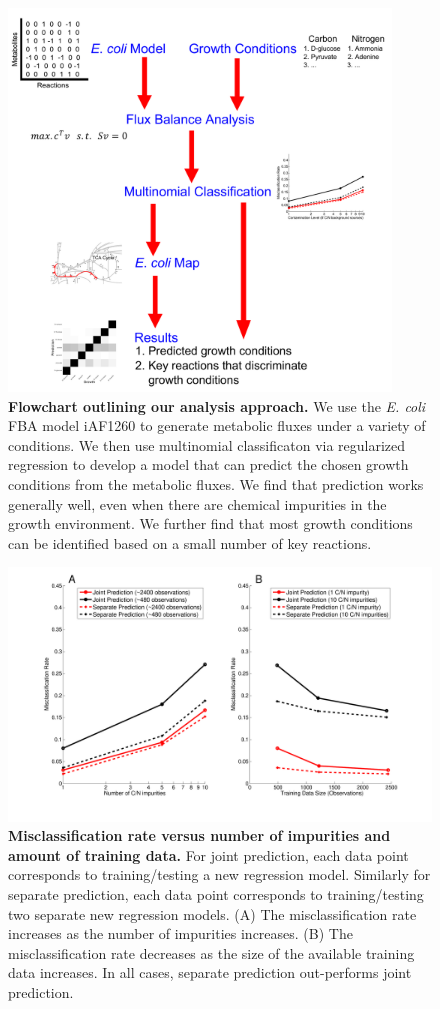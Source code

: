 \documentclass[12pt]{article}
\begin{document}
\begin{figure}[!ht]
\centerline{\includegraphics[width=4in]{Figures/flowchart_new.pdf}}
\caption{\label{fig:flowchart}\textbf{Flowchart outlining our analysis approach.} We use the \emph{E. coli} FBA model iAF1260 to generate metabolic fluxes under a variety of conditions. We then use multinomial classificaton via regularized regression to develop a model that can predict the chosen growth conditions from the metabolic fluxes. We find that prediction works generally well, even when there are chemical impurities in the growth environment. We further find that most growth conditions can be identified based on a small number of key reactions.
}
\end{figure}

\clearpage
\begin{figure}[!ht]
\centerline{\includegraphics[width=5.5in]{Figures/combinedContaminationTrainingdata.pdf}}
\caption{\label{fig:misclassification}\textbf{Misclassification rate versus number of impurities and amount of training data.} For joint prediction, each data point corresponds to training/testing a new regression model. Similarly for separate prediction, each data point corresponds to training/testing two separate new regression models. (A) The misclassification rate increases as the number of impurities increases. (B) The misclassification rate decreases as the size of the available training data increases. In all cases, separate prediction out-performs joint prediction.}
\end{figure}
\end{document}
